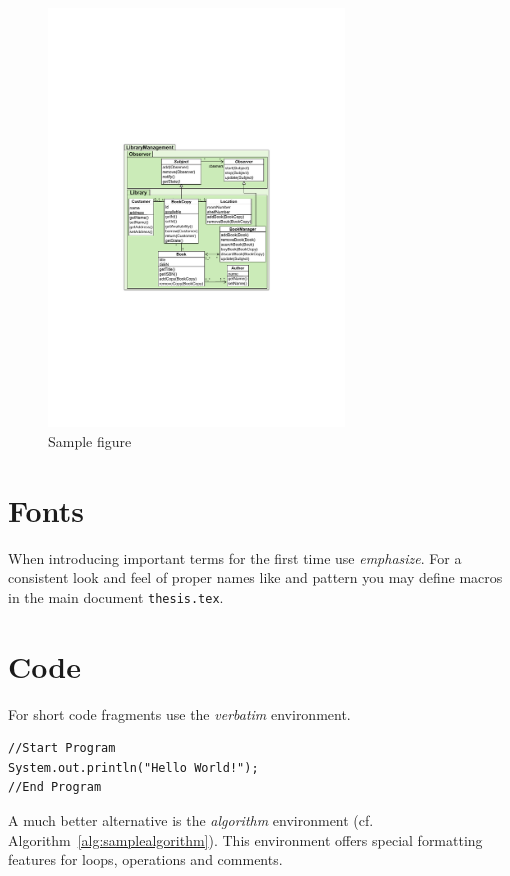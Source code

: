 \begin{figure}[tb]
	\centering
	\includegraphics[width=0.7\textwidth]{chapters/figures/figure1}
	\caption{Sample figure}
	\label{fig:samplefigure_pdf}
\end{figure}


\section{Fonts}

When introducing important terms for the first time use \emph{emphasize}. For a consistent look and feel of proper names like {\cd} and {} pattern you may define macros in the main document \texttt{thesis.tex}.

\section{Code}

For short code fragments use the \textit{verbatim} environment.

\begin{verbatim}
//Start Program
System.out.println("Hello World!");
//End Program
\end{verbatim}

A much better alternative is the \textit{algorithm} environment (cf. Algorithm~\ref{alg:samplealgorithm}). This environment offers special formatting features for loops, operations and comments.

